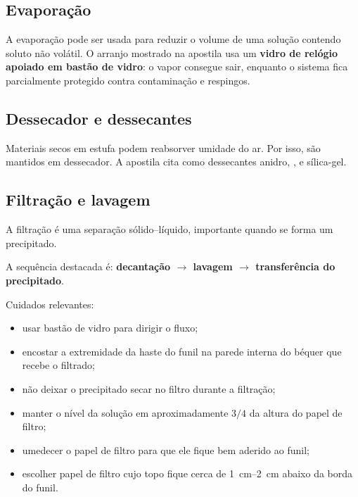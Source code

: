 \documentclass[a4paper,12pt]{article}
\begin{document}
\subsection{Evaporação}

A evaporação pode ser usada para reduzir o volume de uma solução contendo soluto não volátil. O arranjo mostrado na apostila usa um \textbf{vidro de relógio apoiado em bastão de vidro}: o vapor consegue sair, enquanto o sistema fica parcialmente protegido contra contaminação e respingos.

\subsection{Dessecador e dessecantes}

Materiais secos em estufa podem reabsorver umidade do ar. Por isso, são mantidos em dessecador. A apostila cita como dessecantes  anidro, ,  e sílica-gel.

\subsection{Filtração e lavagem}

A filtração é uma separação sólido--líquido, importante quando se forma um precipitado.

\begin{memorize}
A sequência destacada é: \textbf{decantação $\rightarrow$ lavagem $\rightarrow$ transferência do precipitado}.
\end{memorize}

Cuidados relevantes:

\begin{itemize}[leftmargin=1.6em]
    \item usar bastão de vidro para dirigir o fluxo;
    \item encostar a extremidade da haste do funil na parede interna do béquer que recebe o filtrado;
    \item não deixar o precipitado secar no filtro durante a filtração;
    \item manter o nível da solução em aproximadamente $3/4$ da altura do papel de filtro;
    \item umedecer o papel de filtro para que ele fique bem aderido ao funil;
    \item escolher papel de filtro cujo topo fique cerca de \SIrange{1}{2}{\centi\meter} abaixo da borda do funil.
\end{itemize}
\end{document}
